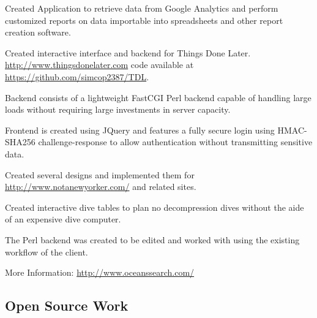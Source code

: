 \documentclass[table,tmargin=1in,bmargin=1in,letterpaper]{resume}
\begin{document}
\begin{compactitem}
\item Created Application to retrieve data from Google Analytics and perform customized reports on data importable into spreadsheets and other report creation software.
\end{compactitem}

\begin{compactitem}
\item Created interactive interface and backend for Things Done Later.  \url{http://www.thingsdonelater.com} code available at \url{https://github.com/simcop2387/TDL}.
\item Backend consists of a lightweight FastCGI Perl backend capable of handling large loads without requiring large investments in server capacity.
\item Frontend is created using JQuery and features a fully secure login using HMAC-SHA256 challenge-response to allow authentication without transmitting sensitive data.
\end{compactitem}

\begin{compactitem}
\item Created several designs and implemented them for \url{http://www.notanewyorker.com/} and related sites.
\end{compactitem}


\begin{compactitem}
\item Created interactive dive tables to plan no decompression dives without the aide of an expensive dive computer.
\item The Perl backend was created to be edited and worked with using the existing workflow of the client.
\item More Information: \url{http://www.oceanssearch.com/}
\end{compactitem}

\vspace{0.2in}

\subsection{Open Source Work}
\end{document}
